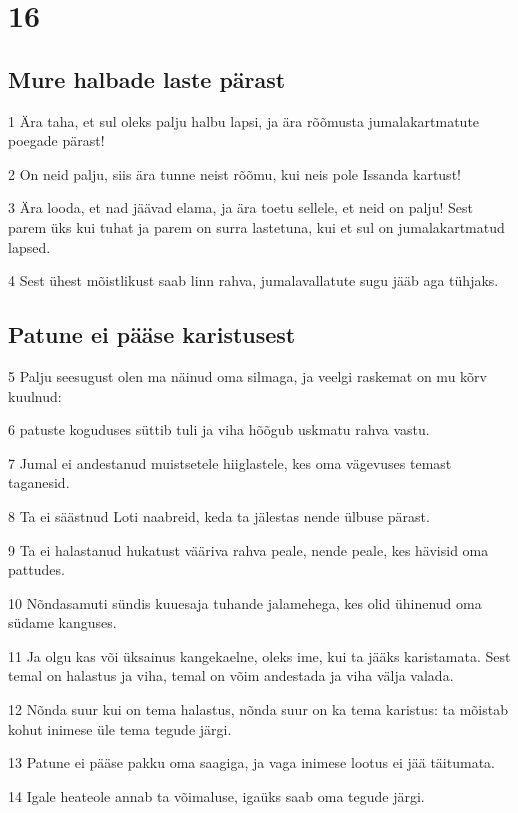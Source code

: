 \chapter{16}

\section*{Mure halbade laste pärast}

\par 1 Ära taha, et sul oleks palju halbu lapsi, ja ära rõõmusta jumalakartmatute poegade pärast!
\par 2 On neid palju, siis ära tunne neist rõõmu, kui neis pole Issanda kartust!
\par 3 Ära looda, et nad jäävad elama, ja ära toetu sellele, et neid on palju! Sest parem üks kui tuhat ja parem on surra lastetuna, kui et sul on jumalakartmatud lapsed.
\par 4 Sest ühest mõistlikust saab linn rahva, jumalavallatute sugu jääb aga tühjaks.

\section*{Patune ei pääse karistusest}

\par 5 Palju seesugust olen ma näinud oma silmaga, ja veelgi raskemat on mu kõrv kuulnud:
\par 6 patuste koguduses süttib tuli ja viha hõõgub uskmatu rahva vastu.
\par 7 Jumal ei andestanud muistsetele hiiglastele, kes oma vägevuses temast taganesid.
\par 8 Ta ei säästnud Loti naabreid, keda ta jälestas nende ülbuse pärast.
\par 9 Ta ei halastanud hukatust vääriva rahva peale, nende peale, kes hävisid oma pattudes.
\par 10 Nõndasamuti sündis kuuesaja tuhande jalamehega, kes olid ühinenud oma südame kanguses.
\par 11 Ja olgu kas või üksainus kangekaelne, oleks ime, kui ta jääks karistamata. Sest temal on halastus ja viha, temal on võim andestada ja viha välja valada.
\par 12 Nõnda suur kui on tema halastus, nõnda suur on ka tema karistus: ta mõistab kohut inimese üle tema tegude järgi.
\par 13 Patune ei pääse pakku oma saagiga, ja vaga inimese lootus ei jää täitumata.
\par 14 Igale heateole annab ta võimaluse, igaüks saab oma tegude järgi.

